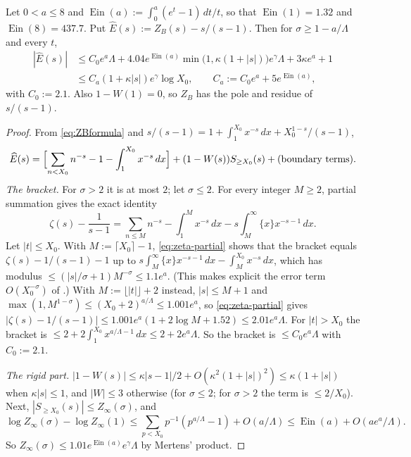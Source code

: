 \begin{lemma}\label{lem:ZBlow}
Let $0<a\le8$ and $\operatorname{Ein}(a):=\int_0^a(e^t-1)\,dt/t$, so that $\operatorname{Ein}(1)=1.32$ and $\operatorname{Ein}(8)=437.7$.
Put $\widehat E(s):=Z_B(s)-s/(s-1)$. Then for $\sigma\ge1-a/\Lambda$ and every $t$,
\[
\begin{aligned}
  |\widehat E(s)|&\le C_0e^a\Lambda+4.04e^{\operatorname{Ein}(a)}\min\bigl(1,\kappa(1+|s|)\bigr)e^{\gamma}\Lambda+3\kappa e^a+1\\
  &\le C_a(1+\kappa|s|)e^{\gamma}\log X_0,\qquad C_a:=C_0e^a+5e^{\operatorname{Ein}(a)},
\end{aligned}
\]
with $C_0:=2.1$. Also $1-W(1)=0$, so $Z_B$ has the pole and residue of $s/(s-1)$.
\end{lemma}
\begin{proof}
From \eqref{eq:ZBformula} and $s/(s-1)=1+\int_1^{X_0}x^{-s}\,dx+X_0^{1-s}/(s-1)$,
\[
  \widehat E(s)=\Bigl[\sum_{n<X_0}n^{-s}-1-\int_1^{X_0}x^{-s}\,dx\Bigr]+(1-W(s))S_{\ge X_0}(s)+(\text{boundary terms}).
\]
\emph{The bracket.} For $\sigma>2$ it is at most $2$; let $\sigma\le2$. For every integer $M\ge2$, partial summation gives the
exact identity
\begin{equation}\label{eq:zeta-partial}
  \zeta(s)-\frac1{s-1}=\sum_{n\le M}n^{-s}-\int_1^Mx^{-s}\,dx-s\int_M^\infty\{x\}x^{-s-1}\,dx .
\end{equation}
Let $|t|\le X_0$. With $M:=\lceil X_0\rceil-1$, \eqref{eq:zeta-partial} shows that the bracket equals $\zeta(s)-1/(s-1)-1$ up to
$s\int_M^\infty\{x\}x^{-s-1}\,dx-\int_M^{X_0}x^{-s}\,dx$, which has modulus $\le(|s|/\sigma+1)M^{-\sigma}\le1.1e^a$. (This makes
explicit the error term $O(X_0^{-\sigma})$ of \cite[Thm.~4.11]{Titchmarsh1986}.) With $M:=\lfloor|t|\rfloor+2$ instead, $|s|\le M+1$
and $\max(1,M^{1-\sigma})\le(X_0+2)^{a/\Lambda}\le1.001e^a$, so \eqref{eq:zeta-partial} gives
$|\zeta(s)-1/(s-1)|\le1.001e^a(1+2\log M+1.52)\le2.01e^a\Lambda$. For $|t|>X_0$ the bracket is
$\le2+2\int_1^{X_0}x^{a/\Lambda-1}\,dx\le2+2e^a\Lambda$. So the bracket is $\le C_0e^a\Lambda$ with $C_0:=2.1$.

\emph{The rigid part.} $|1-W(s)|\le\kappa|s-1|/2+O(\kappa^2(1+|s|)^2)\le\kappa(1+|s|)$ when $\kappa|s|\le1$, and $|W|\le3$ otherwise
(for $\sigma\le2$; for $\sigma>2$ the term is $\le2/X_0$). Next, $|S_{\ge X_0}(s)|\le Z_\infty(\sigma)$, and
\[
  \log Z_\infty(\sigma)-\log Z_\infty(1)\le\sum_{p<X_0}p^{-1}(p^{a/\Lambda}-1)+O(a/\Lambda)\le\operatorname{Ein}(a)+O(ae^a/\Lambda).
\]
So $Z_\infty(\sigma)\le1.01e^{\operatorname{Ein}(a)}e^{\gamma}\Lambda$ by Mertens' product.


\end{proof}
